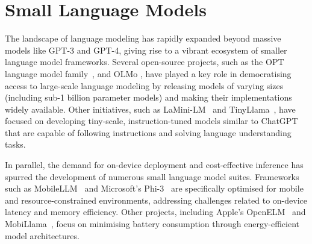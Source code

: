 

\section{Small Language Models}

The landscape of language modeling has rapidly expanded beyond massive models like GPT-3 and GPT-4, giving rise to a vibrant ecosystem of smaller language model frameworks. Several open-source projects, such as the OPT language model family~\citep{zhang2022opt},  \citep{biderman2023pythia} and OLMo \citep{groeneveld2024olmo}, have played a key role in democratising access to large-scale language modeling by releasing models of varying sizes (including sub-1 billion parameter models) and making their implementations widely available. Other initiatives, such as LaMini-LM~\citep{wu2024lamini} and TinyLlama~\citep{zhang2024tinyllama}, have focused on developing tiny-scale, instruction-tuned models similar to ChatGPT that are capable of following instructions and solving language understanding tasks.

In parallel, the demand for on-device deployment and cost-effective inference has spurred the development of numerous small language model suites. Frameworks such as MobileLLM~\citep{liu2024mobilellm} and Microsoft's Phi-3~\citep{abdin2024phi} are specifically optimised for mobile and resource-constrained environments, addressing challenges related to on-device latency and memory efficiency. Other projects, including Apple's OpenELM~\citep{mehta2024openelm} and MobiLlama~\citep{thawakar2024mobillama}, focus on minimising battery consumption through energy-efficient model architectures.


